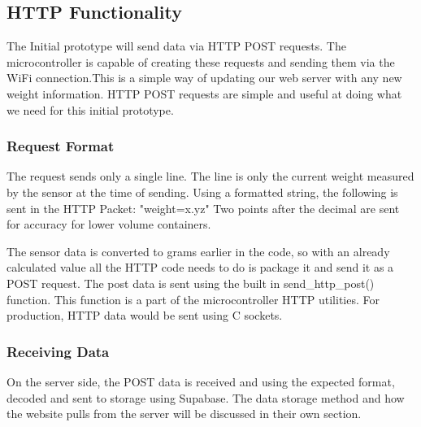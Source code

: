 \subsection{HTTP Functionality}

The Initial prototype will send data via HTTP POST requests. The microcontroller is capable of creating these requests and sending them via the WiFi connection.This is a simple way of updating our web server with any new weight information. HTTP POST requests are simple and useful at doing what we need for this initial prototype.

\subsubsection{Request Format}

The request sends only a single line. The line is only the current weight measured by the sensor at the time of sending. Using a formatted string, the following is sent in the HTTP Packet: "weight=x.yz" Two points after the decimal are sent for accuracy for lower volume containers. 

The sensor data is converted to grams earlier in the code, so with an already calculated value all the HTTP code needs to do is package it and send it as a POST request. The post data is sent using the built in send\_http\_post() function. This function is a part of the microcontroller HTTP utilities. For production, HTTP data would be sent using C sockets. 

\subsubsection{Receiving Data}

On the server side, the POST data is received and using the expected format, decoded and sent to storage using Supabase. The data storage method and how the website pulls from the server will be discussed in their own section. 